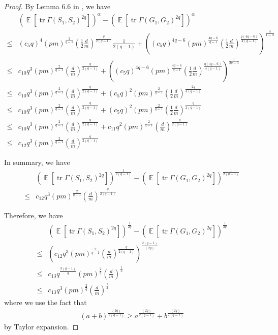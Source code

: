 \documentclass[11pt]{amsart}
\numberwithin{equation}{section}
\numberwithin{equation}{section}
\DeclareMathOperator{\E}{\mathbb{E}}
\DeclareMathOperator*{\tr}{tr}
\theoremstyle{remark}
\theoremstyle{definition}
\begin{document}
\begin{proof}
By Lemma 6.6 in \cite{brailovskaya2022universality}, we have
\begin{align*}
    &(\E[\tr \Gamma(S_1,S_2)^{2q}])^{\alpha}-(\E[\tr \Gamma(G_1,G_2)^{2q}])^{\alpha} \\\le& (c_5q)^4 (pm)^{\frac{2}{q-1}} (\frac{1}{2}\frac{d}{m})^{\frac{q}{2(q-1)}} \frac{1}{2(q-1)}+((c_5q)^{4q-6} (pm)^{\frac{4q-6}{q-1}} (\frac{1}{2}\frac{d}{m})^{\frac{q(4q-6)}{4(q-1)}})^{\frac{\alpha}{1-\alpha}}
    \\ \le & c_{10} q^{3} (pm)^{\frac{2}{q-1}} (\frac{d}{m})^{\frac{q}{2(q-1)}}+((c_5q)^{4q-6} (pm)^{\frac{4q-6}{q-1}}(\frac{1}{2}\frac{d}{m})^{\frac{q(4q-6)}{4(q-1)}})^{\frac{1}{2q-3}}
    \\ \le & c_{10} q^{3} (pm)^{\frac{2}{q-1}} (\frac{d}{m})^{\frac{q}{2(q-1)}}+(c_5q)^{2} (pm)^{\frac{2}{q-1}} (\frac{1}{2}\frac{d}{m})^{\frac{2q}{4(q-1)}}
    \\ \le & c_{10} q^{3} (pm)^{\frac{2}{q-1}} (\frac{d}{m})^{\frac{q}{2(q-1)}}+(c_5q)^{2} (pm)^{\frac{2}{q-1}} (\frac{1}{2}\frac{d}{m})^{\frac{q}{2(q-1)}}
    \\ \le & c_{10} q^{3} (pm)^{\frac{2}{q-1}} (\frac{d}{m})^{\frac{q}{2(q-1)}}+c_{11}q^{2} (pm)^{\frac{2}{q-1}}(\frac{d}{m})^{\frac{q}{2(q-1)}}
    \\ \le & c_{12} q^{3} (pm)^{\frac{2}{q-1}} (\frac{d}{m})^{\frac{q}{2(q-1)}}
\end{align*}

In summary, we have
\begin{align*}
    &(\E[\tr \Gamma(S_1,S_2)^{2q}])^{\frac{1}{2(q-1)}}-(\E[\tr \Gamma(G_1,G_2)^{2q}])^{\frac{1}{2(q-1)}} \\\le& c_{12} q^{3} (pm)^{\frac{2}{q-1}} (\frac{d}{m})^{\frac{q}{2(q-1)}}
\end{align*}

Therefore, we have
\begin{align*}
    &(\E[\tr \Gamma(S_1,S_2)^{2q}])^{\frac{1}{2q}}-(\E[\tr \Gamma(G_1,G_2)^{2q}])^{\frac{1}{2q}} \\\le& (c_{12} q^{3} (pm)^{\frac{2}{q-1}} (\frac{d}{m})^{\frac{q}{2(q-1)}})^{\frac{2(q-1)}{(2q)}}
    \\\le& c_{13} q^{\frac{3(q-1)}{q}} (pm)^{\frac{2}{q}} (\frac{d}{m})^{\frac{1}{2}}
    \\\le& c_{13} q^3 (pm)^{\frac{2}{q}} (\frac{d}{m})^{\frac{1}{2}}
\end{align*}
where we use the fact that
\begin{align*}
    (a+b)^{\frac{(2q)}{2(q-1)}} \ge a^{\frac{(2q)}{2(q-1)}}+b^{\frac{(2q)}{2(q-1)}}
\end{align*}
by Taylor expansion.


\end{proof}
\end{document}
